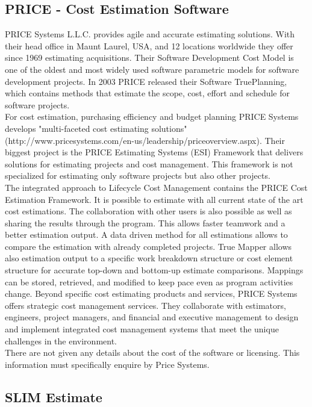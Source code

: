 \subsection{PRICE - Cost Estimation Software}

PRICE Systems L.L.C. provides agile and accurate estimating solutions. With their head office in Maunt Laurel, USA, and 12 locations worldwide they offer since 1969 estimating acquisitions. Their Software Development Cost Model is one of the oldest and most widely used software parametric models for software development projects. In 2003 PRICE released their Software TruePlanning, which contains methods that estimate the scope, cost, effort and schedule for software projects.
\\
For cost estimation, purchasing efficiency and budget planning PRICE Systems develops "multi-faceted cost estimating solutions" (http://www.pricesystems.com/en-us/leadership/priceoverview.aspx). Their biggest project is the PRICE Estimating Systems (ESI) Framework that delivers solutions for estimating projects and cost management. This framework is not specialized for estimating only software projects but also other projects.
\\
The integrated approach to Lifecycle Cost Management contains the PRICE Cost Estimation Framework. It is possible to estimate with all current state of the art cost estimations. The collaboration with other users is also possible as well as sharing the results through the program. This allows faster teamwork and a better estimation output. A data driven method for all estimations allows to compare the estimation with already completed projects. True Mapper allows also estimation output to a specific work breakdown structure or cost element structure for accurate top-down and bottom-up estimate comparisons. Mappings can be stored, retrieved, and modified to keep pace even as program activities change. Beyond specific cost estimating products and services, PRICE Systems offers strategic cost management services. They collaborate with estimators, engineers, project managers, and financial and executive management to design and implement integrated cost management systems that meet the unique challenges in the environment.
\\
There are not given any details about the cost of the software or licensing. This information must specifically enquire by Price Systems.

\subsection{SLIM Estimate}

